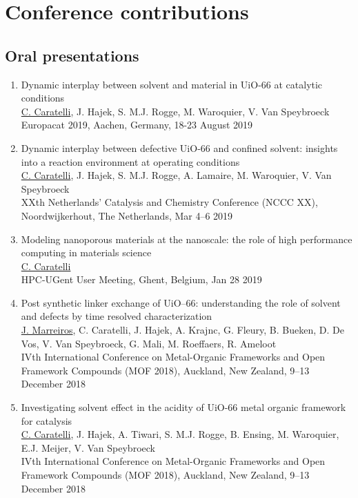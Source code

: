 \section*{Conference contributions}
\subsection*{Oral presentations}
\begin{enumerate}

\item
Dynamic interplay between solvent and material in UiO-66 at catalytic conditions\\
\underline{C. Caratelli}, J. Hajek, S. M.J. Rogge, M. Waroquier, V. Van Speybroeck\\
Europacat 2019, Aachen, Germany, 18-23 August 2019

\item
Dynamic interplay between defective UiO-66 and confined solvent: insights into a reaction environment at operating conditions\\
\underline{C. Caratelli}, J. Hajek, S. M.J. Rogge, A. Lamaire, M. Waroquier, V. Van Speybroeck\\
XXth Netherlands' Catalysis and Chemistry Conference (NCCC XX), Noordwijkerhout, The Netherlands, Mar 4--6 2019

\item
Modeling nanoporous materials at the nanoscale: the role of high performance computing in materials science\\
\underline{C. Caratelli}\\
HPC-UGent User Meeting, Ghent, Belgium, Jan 28 2019

\item
Post synthetic linker exchange of UiO--66: understanding the role of solvent and defects by time resolved characterization\\
\underline{J. Marreiros}, C. Caratelli, J. Hajek, A. Krajnc, G. Fleury, B. Bueken, D. De Vos, V. Van Speybroeck, G. Mali, M. Roeffaers, R. Ameloot\\
IVth International Conference on Metal-Organic Frameworks and Open Framework Compounds (MOF 2018),
Auckland, New Zealand, 9--13 December 2018

\item
Investigating solvent effect in the acidity of UiO-66 metal organic framework for catalysis\\
\underline{C. Caratelli}, J. Hajek, A. Tiwari, S. M.J. Rogge, B. Ensing, M. Waroquier, E.J. Meijer, V. Van Speybroeck\\
IVth International Conference on Metal-Organic Frameworks and Open Framework Compounds (MOF 2018),
Auckland, New Zealand, 9--13 December 2018


\end{enumerate}
